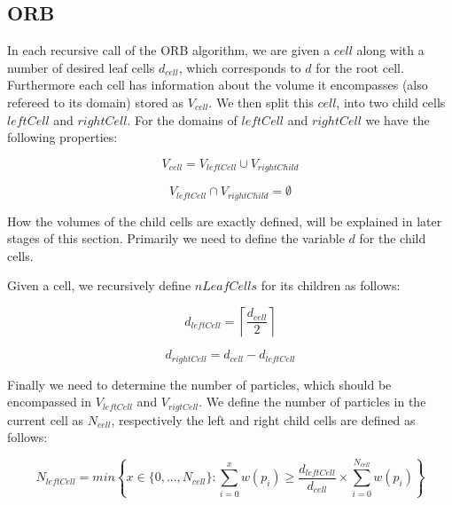 \documentclass[]{article}
\begin{document}
\subsection{ORB}


In each recursive call of the ORB algorithm, we are given a $cell$ along with a number of desired leaf cells $d_{cell}$, which corresponds to $d$ for the root cell. Furthermore each cell has information about the volume it encompasses (also refereed to its domain) stored as $V_{cell}$. We then split this $cell$, into two child cells $leftCell$ and $rightCell$. For the domains of $leftCell$ and $rightCell$ we have the following properties: 

\begin{center}
	\begin{equation}
		V_{cell} = V_{leftCell} \cup V_{rightChild}
	\end{equation}
\end{center}

\begin{center}
	\begin{equation}
		V_{leftCell} \cap V_{rightChild} = \emptyset
	\end{equation}
\end{center}

How the volumes of the child cells are exactly defined, will be explained in later stages of this section. Primarily we need to define the variable $d$ for the child cells.

Given a cell, we recursively define $nLeafCells$ for its children as follows:

\begin{center}
	\begin{equation}
		d_{leftCell} = \left \lceil\frac{d_{cell}}{2} \right \rceil 
	\end{equation}
\end{center}

\begin{center}
	\begin{equation}
		d_{rightCell} = d_{cell} - d_{leftCell}
	\end{equation}
\end{center}

Finally we need to determine the number of particles, which should be encompassed in $V_{leftCell}$ and $V_{rigtCell}$. We define the number of particles in the current cell as $N_{cell}$, respectively the left and right child cells are defined as follows:

\begin{center}
	\begin{equation}
		N_{leftCell} = min \left \{ x \in \{0,...,N_{cell} \} : \sum_{i=0}^{x} w(p_i) \geq \frac{d_{leftCell}}{d_{cell}} \times \sum_{i=0}^{N_{cell}} w(p_i) \right \} 
	\end{equation}
\end{center}
\end{document}
